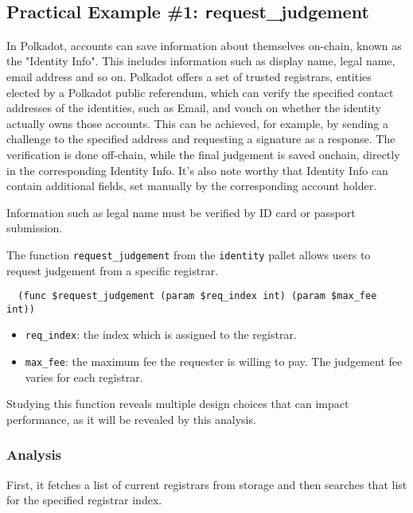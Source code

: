 \documentclass[11pt,a4paper]{article}
\begin{document}
\subsection{Practical Example \#1: {\texttt request\_judgement}}

In Polkadot, accounts can save information about themselves on-chain, known as
the "Identity Info". This includes information such as display name, legal name,
email address and so on. Polkadot offers a set of trusted registrars, entities
elected by a Polkadot public referendum, which can verify the specified contact
addresses of the identities, such as Email, and vouch on whether the identity
actually owns those accounts. This can be achieved, for example, by sending a
challenge to the specified address and requesting a signature as a response. The
verification is done off-chain, while the final judgement is saved onchain,
directly in the corresponding Identity Info. It's also note worthy that Identity
Info can contain additional fields, set manually by the corresponding account
holder.

Information such as legal name must be verified by ID card or passport
submission.
\newline

The function \verb|request_judgement| from the \verb|identity| pallet allows
users to request judgement from a specific registrar.

\begin{verbatim}
  (func $request_judgement (param $req_index int) (param $max_fee int))
\end{verbatim}

\begin{itemize}
  \item \verb|req_index|: the index which is assigned to the registrar.
  \item \verb|max_fee|: the maximum fee the requester is willing to pay. The
  judgement fee varies for each registrar.
\end{itemize}

Studying this function reveals multiple design choices that can impact
performance, as it will be revealed by this analysis.
\newline

\subsubsection{Analysis}

First, it fetches a list of current registrars from storage and then searches
that list for the specified registrar index.
\end{document}
